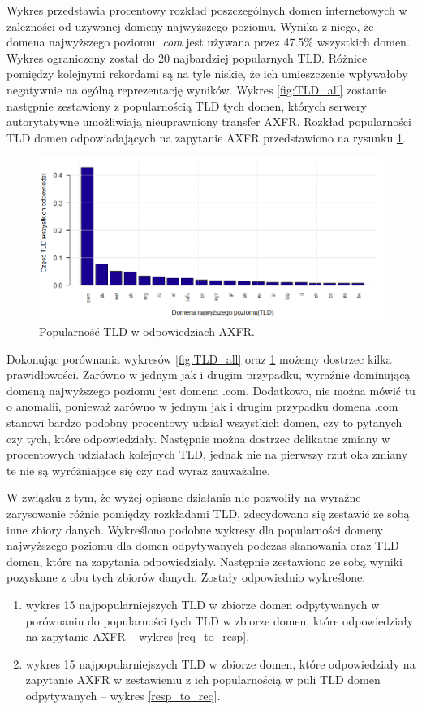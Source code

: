 Wykres przedstawia procentowy rozkład poszczególnych domen internetowych w zależności od używanej domeny najwyższego poziomu.
Wynika z niego, że domena najwyższego poziomu \textit{.com} jest używana przez 47.5\% wszystkich domen. Wykres ograniczony został
do 20 najbardziej popularnych TLD. Różnice pomiędzy kolejnymi rekordami są na tyle niskie, że ich umieszczenie wpływałoby negatywnie
na ogólną reprezentację wyników. Wykres \ref{fig:TLD_all} zostanie następnie zestawiony z popularnością TLD tych domen, których serwery
autorytatywne umożliwiają nieuprawniony transfer AXFR. Rozkład popularności TLD domen odpowiadających na zapytanie AXFR przedstawiono
na rysunku \ref{fig:resp}.
\begin{center}
	\begin{figure}
		\includegraphics[width=1.0\textwidth]{image/resp_no_title}
		\caption{Popularność TLD w odpowiedziach AXFR.}
		\label{fig:resp}
	\end{figure}
\end{center}

Dokonując porównania wykresów \ref{fig:TLD_all} oraz \ref{fig:resp} możemy dostrzec kilka prawidłowości. Zarówno w jednym jak i
drugim przypadku, wyraźnie dominującą domeną najwyższego poziomu jest domena .com. Dodatkowo, nie można mówić tu o anomalii,
ponieważ zarówno w jednym jak i drugim przypadku domena .com stanowi bardzo podobny procentowy udział wszystkich domen, czy to
pytanych czy tych, które odpowiedziały. Następnie można dostrzec delikatne zmiany w procentowych udziałach kolejnych TLD, jednak
nie na pierwszy rzut oka zmiany te nie są wyróżniające się czy nad wyraz zauważalne.

W związku z tym, że wyżej opisane działania nie pozwoliły na wyraźne zarysowanie różnic pomiędzy rozkładami TLD, zdecydowano się
zestawić ze sobą inne zbiory danych. Wykreślono podobne wykresy dla popularności domeny najwyższego poziomu dla domen odpytywanych
podczas skanowania oraz TLD domen, które na zapytania odpowiedziały. Następnie zestawiono ze sobą wyniki pozyskane z obu tych zbiorów
danych. Zostały odpowiednio wykreślone:
\begin{enumerate}
	\item wykres 15 najpopularniejszych TLD w zbiorze domen odpytywanych w porównaniu do popularności tych TLD w zbiorze domen,
	które odpowiedziały na zapytanie AXFR -- wykres \ref{req_to_resp},
	\item wykres 15 najpopularniejszych TLD w zbiorze domen, które odpowiedziały na zapytanie AXFR w zestawieniu z ich popularnością
	w puli TLD domen odpytywanych -- wykres \ref{resp_to_req}.
\end{enumerate}

